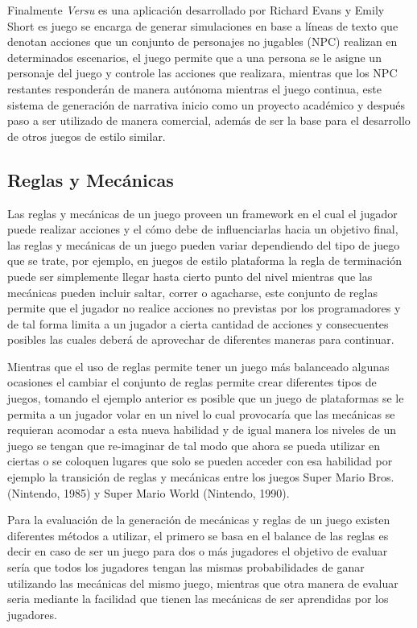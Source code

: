 Finalmente \textit{Versu} es una aplicación desarrollado por Richard Evans y
Emily Short \cite{evans2013versu} es juego se encarga de generar simulaciones en
base a líneas de texto que denotan acciones que un conjunto de personajes no
jugables (NPC) realizan en determinados escenarios, el juego permite que a una
persona se le asigne un personaje del juego y controle las acciones que
realizara, mientras que los NPC restantes responderán de manera autónoma
mientras el juego continua, este sistema de generación de narrativa inicio como
un proyecto académico y después paso a ser utilizado de manera comercial, además
de ser la base para el desarrollo de otros juegos de estilo similar.

\subsection{Reglas y Mecánicas}
\label{subsection:rulesandmechanics}

Las reglas y mecánicas de un juego proveen un framework en el cual el
jugador puede realizar acciones y el cómo debe de influenciarlas hacia un
objetivo final, las reglas y mecánicas de un juego pueden variar dependiendo del
tipo de juego que se trate, por ejemplo, en juegos de estilo plataforma la regla
de terminación puede ser simplemente llegar hasta cierto punto del nivel
mientras que las mecánicas pueden incluir saltar, correr o agacharse, este
conjunto de reglas permite que el jugador no realice acciones no previstas por
los programadores y de tal forma limita a un jugador a cierta cantidad de
acciones y consecuentes posibles las cuales deberá de aprovechar de diferentes
maneras para continuar.

Mientras que el uso de reglas permite tener un juego más balanceado algunas
ocasiones el cambiar el conjunto de reglas permite crear diferentes tipos de
juegos, tomando el ejemplo anterior es posible que un juego de plataformas se le
permita a un jugador volar en un nivel lo cual provocaría que las mecánicas se
requieran acomodar a esta nueva habilidad y de igual manera los niveles de un
juego se tengan que re-imaginar de tal modo que ahora se pueda utilizar en
ciertas o se coloquen lugares que solo se pueden acceder con esa habilidad por
ejemplo la transición de reglas y mecánicas entre los juegos Super Mario Bros.
(Nintendo, 1985) y Super Mario World (Nintendo, 1990). %

Para la evaluación de la generación de mecánicas y reglas de un juego existen
diferentes métodos a utilizar, el primero se basa en el balance de las reglas es
decir en caso de ser un juego para dos o más jugadores el objetivo de evaluar
sería que todos los jugadores tengan las mismas probabilidades de ganar
utilizando las mecánicas del mismo juego, mientras que otra manera de evaluar
seria mediante la facilidad que tienen las mecánicas de ser aprendidas por los
jugadores.

